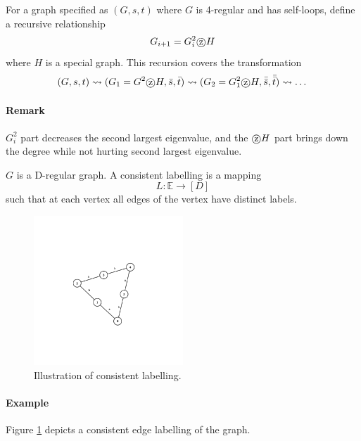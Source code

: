 \documentclass[11pt, letter]{book}
\newcommand*\tcircle[1]{%
  \raisebox{-0.5pt}{%
    \textcircled{#1}%
  }%
}
\begin{document}
\begin{algorithm}[Reingold, 2005]
	For a graph specified as $(G, s, t)$ where $G$ is 4-regular and has self-loops, define a recursive relationship 
	\begin{equation}
		G_{i + 1} = G_i ^2 \tcircle{z} H
	\end{equation}
	where $H$ is a special graph. This recursion covers the transformation
	\begin{equation}
		(G, s, t) \leadsto (G_1 = G^2 \tcircle{z} H, \bar s, \bar t) \leadsto (G_2 = G_1^2 \tcircle{z} H, \bar{\bar{s}}, \bar{\bar{t}} ) \leadsto \dots
	\end{equation}
	
	\paragraph{Remark} $G_i^2$ part decreases the second largest eigenvalue, and the $\tcircle{z} H$ part brings down the degree while not hurting second largest eigenvalue. 
\end{algorithm}

\begin{definition}
	$G$ is a D-regular graph. A consistent labelling is a mapping 
	\begin{equation}
		L: \mathbb E \rightarrow [D]
	\end{equation}
	such that at each vertex all edges of the vertex have distinct labels. 
\end{definition}


\begin{figure}
	\centering
	\includegraphics[width=0.5\textwidth]{figs/consistentlabelling-1.png}
	\caption{Illustration of consistent labelling.\label{fig:consistent-labeling-1}}
\end{figure}


\paragraph{Example} Figure \ref{fig:consistent-labeling-1} depicts a consistent edge labelling of the graph. 
\end{document}
